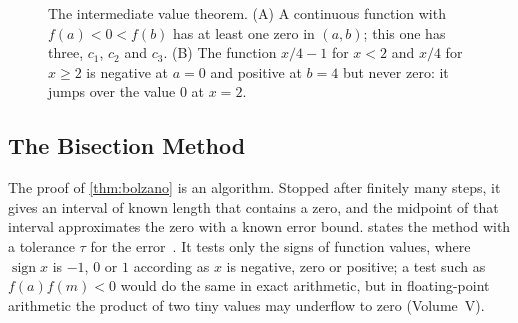 \begin{figure}
\hfill
{}
\caption{The intermediate value theorem. (A) A continuous function with $f(a)<0<f(b)$ has at least one zero in $(a,b)$; this one has three, $c_1$, $c_2$ and $c_3$. (B) The function $x/4-1$ for $x<2$ and $x/4$ for $x\ge2$ is negative at $a=0$ and positive at $b=4$ but never zero: it jumps over the value $0$ at $x=2$.}
\label{fig:ivt}
\end{figure}

\subsection{The Bisection Method}

The proof of \cref{thm:bolzano} is an algorithm. Stopped after finitely many steps, it gives an interval of known length that contains a zero, and the midpoint of that interval approximates the zero with a known error bound.  states the method with a tolerance $\tau$ for the error~\cite{suli2003}. It tests only the signs of function values, where $\operatorname{sign}x$ is $-1$, $0$ or $1$ according as $x$ is negative, zero or positive; a test such as $f(a)f(m)<0$ would do the same in exact arithmetic, but in floating-point arithmetic the product of two tiny values may underflow to zero (Volume~V).

